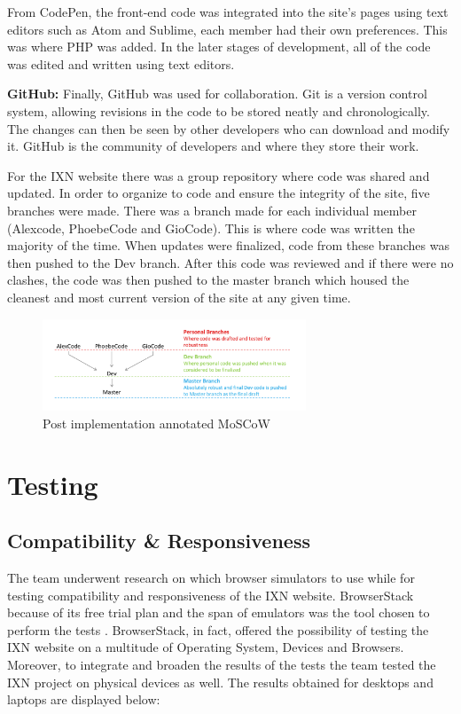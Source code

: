 \documentclass[fontsize=10pt]{extarticle}
\numberwithin{figure}{section} %
\begin{document}
From CodePen, the front-end code was integrated into the site's pages
using text editors such as Atom and Sublime, each member had their own
preferences. This was where PHP was added. In the later stages of
development, all of the code was edited and written using text editors.

\textbf{GitHub:} Finally, GitHub was used for collaboration. Git is a
version control system, allowing revisions in the code to be stored
neatly and chronologically. The changes can then be seen by other
developers who can download and modify it. \cite{p20} GitHub is the
community of developers and where they store their work.

For the IXN website there was a group repository where code was shared
and updated. In order to organize to code and ensure the integrity of
the site, five branches were made. There was a branch made for each
individual member (Alexcode, PhoebeCode and GioCode). This is where code
was written the majority of the time. When updates were finalized, code
from these branches was then pushed to the Dev branch. After this code
was reviewed and if there were no clashes, the code was then pushed to
the master branch which housed the cleanest and most current version of
the site at any given time.

\begin{figure}[H]
      \centering
      \includegraphics[trim = 0 0 0 0, clip, width=0.7\textwidth]{ph15.png}
      \caption{Post implementation annotated MoSCoW}
 \end{figure}

\hypertarget{testing}{%
\section{Testing}\label{testing}}

\hypertarget{compatibility-responsiveness}{%
\subsection{Compatibility \&
Responsiveness}\label{compatibility-responsiveness}}

The team underwent research on which browser simulators to use while for
testing compatibility and responsiveness of the IXN website.
BrowserStack because of its free trial plan and the span of emulators
was the tool chosen to perform the tests \cite{g6}. BrowserStack, in
fact, offered the possibility of testing the IXN website on a multitude
of Operating System, Devices and Browsers. Moreover, to integrate and
broaden the results of the tests the team tested the IXN project on
physical devices as well. The results obtained for desktops and laptops
are displayed below:
\end{document}
